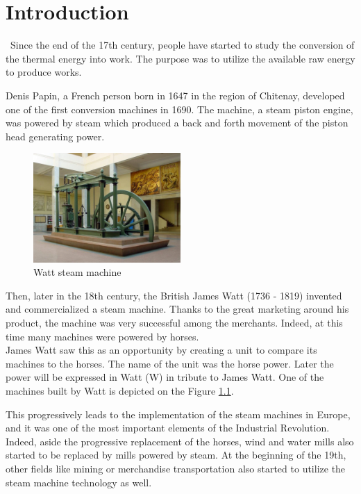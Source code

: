\graphicspath{{Chapitre_2/Images/}}
\chapter{Introduction}\label{introduction}
\setlength{\headheight}{52pt}    
\quad\, Since the end of the 17th century, people have started to study the conversion of the thermal energy into work. The purpose was to utilize the available raw energy to produce works.

Denis Papin, a French person born in 1647 in the region of Chitenay, developed one of the first conversion machines in 1690. The machine, a steam piston engine, was powered by steam which produced a back and forth movement of the piston head generating power. 

\begin{figure}[h]
    \centering
    \includegraphics[width=0.5\textwidth]{Chapitre_1/Images/Maquina_vapor_Watt_ETSIIM.jpg}
    \caption{Watt steam machine\cite{Watt}}
    \label{fig:Watt}
\end{figure}

Then, later in the 18th century, the British James Watt (1736 - 1819) invented and commercialized a steam machine. Thanks to the great marketing around his product, the machine was very successful among the merchants. Indeed, at this time many machines were powered by horses.\\

James Watt saw this as an opportunity by creating a unit to compare its machines to the horses. The name of the unit was the horse power. Later the power will be expressed in Watt (W) in tribute to James Watt. One of the machines built by Watt is depicted on the Figure \ref{fig:Watt}.

This progressively leads to the implementation of the steam machines in Europe, and it was one of the most important elements of the Industrial Revolution. Indeed, aside the progressive replacement of the horses, wind and water mills also started to be replaced by mills powered by steam. At the beginning of the 19th, other fields like mining or merchandise transportation also started to utilize the steam machine technology as well.

